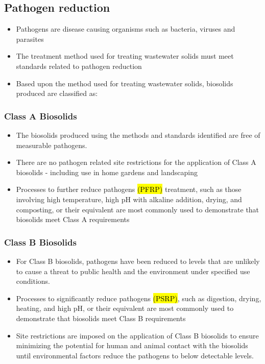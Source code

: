 \subsection{Pathogen reduction}
			\begin{itemize}
				\item Pathogens are disease causing organisms such as bacteria, viruses and parasites
				\item The treatment method used for treating wastewater solids must meet standards related to pathogen reduction
				\item Based upon the method used for treating wastewater solids, biosolids produced are classified as:
				\end{itemize}
\subsubsection{Class A Biosolids}
					\begin{itemize}
								\item The biosolids produced using the methods and standards identified are free of measurable pathogens.
								\item There are no pathogen related site restrictions for the application of Class A biosolids - including use in home gardens and landscaping
								\item Processes to further reduce pathogens \hl{(PFRP)} treatment, such as those involving high temperature, high pH with alkaline addition, drying, and composting, or their equivalent are most commonly used to demonstrate that biosolids meet Class A requirements
							\end{itemize}
\subsubsection{Class B Biosolids} 
									\begin{itemize}
										\item For Class B biosolids, pathogens have been reduced to levels that are unlikely to cause a threat to public health and the environment under specified use conditions.
										\item Processes to significantly reduce pathogens \hl{(PSRP)}, such as digestion, drying, heating, and high pH, or their equivalent are most commonly used to demonstrate that biosolids meet Class B requirements
										\item Site restrictions are imposed on the application of Class B biosolids to ensure minimizing the potential for human and animal contact with the biosolids until environmental factors reduce the pathogens to below detectable levels.
									\end{itemize}
